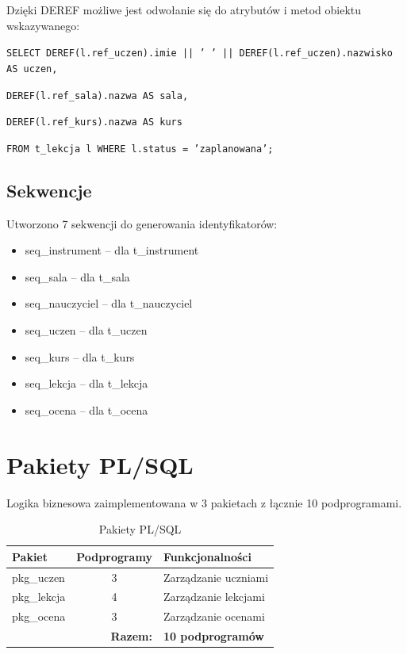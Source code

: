\documentclass[12pt,a4paper]{article}
\begin{document}
Dzięki DEREF możliwe jest odwołanie się do atrybutów i metod obiektu wskazywanego:

\texttt{SELECT DEREF(l.ref\_uczen).imie || ' ' || DEREF(l.ref\_uczen).nazwisko AS uczen,}

\texttt{\hspace{1.5cm}DEREF(l.ref\_sala).nazwa AS sala,}

\texttt{\hspace{1.5cm}DEREF(l.ref\_kurs).nazwa AS kurs}

\texttt{FROM t\_lekcja l WHERE l.status = 'zaplanowana';}

\subsection{Sekwencje}

Utworzono 7 sekwencji do generowania identyfikatorów:

\begin{itemize}[nosep]
    \item seq\_instrument -- dla t\_instrument
    \item seq\_sala -- dla t\_sala
    \item seq\_nauczyciel -- dla t\_nauczyciel
    \item seq\_uczen -- dla t\_uczen
    \item seq\_kurs -- dla t\_kurs
    \item seq\_lekcja -- dla t\_lekcja
    \item seq\_ocena -- dla t\_ocena
\end{itemize}

\newpage
\section{Pakiety PL/SQL}

Logika biznesowa zaimplementowana w 3 pakietach z łącznie 10 podprogramami.

\begin{table}[h]
\centering
\begin{tabular}{|l|c|p{7cm}|}
\hline
\textbf{Pakiet} & \textbf{Podprogramy} & \textbf{Funkcjonalności} \\
\hline
pkg\_uczen & 3 & Zarządzanie uczniami \\
pkg\_lekcja & 4 & Zarządzanie lekcjami \\
pkg\_ocena & 3 & Zarządzanie ocenami \\
\hline
\multicolumn{2}{|r|}{\textbf{Razem:}} & \textbf{10 podprogramów} \\
\hline
\end{tabular}
\caption{Pakiety PL/SQL}
\end{table}
\end{document}
